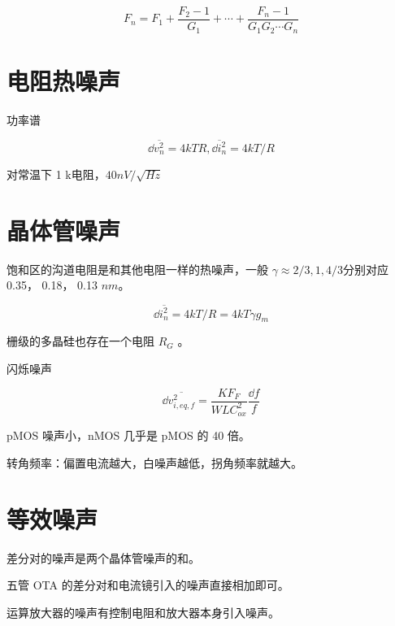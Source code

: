 \documentclass[cn,11pt,chinese,black,simple]{../elegantbook}
\begin{document}
\[F_n = F_1 + \frac{F_2 - 1}{G_1} + \cdots + \frac{F_n - 1}{G_1 G_2 \cdots G_n}\]

\section{电阻热噪声}

功率谱

\[{\dd{}\overline{v_n^2} = 4 k T R}, \overline{\dd{i_n^2}} = 4kT/R\]

对常温下 1 k电阻，\(40 nV/\sqrt{Hz}\)
\section{晶体管噪声}

饱和区的沟道电阻是和其他电阻一样的热噪声，一般 \(\gamma \approx 2/3, 1, 4/3\)分别对应 0.35， 0.18， 0.13 \(nm\)。

\[\dd{\overline{i_n^2}} = 4 k T / R = 4 k T \gamma g_m\]

栅级的多晶硅也存在一个电阻 \(R_G\) 。

闪烁噪声 

\[\dd{\overline{v_{i,eq,f}^2}} = \frac{KF_F}{WLC_{ox}^2}\frac{\dd{f}}{f}\]

pMOS 噪声小，nMOS 几乎是 pMOS 的 40 倍。

转角频率：偏置电流越大，白噪声越低，拐角频率就越大。

\section{等效噪声}

差分对的噪声是两个晶体管噪声的和。

五管 OTA 的差分对和电流镜引入的噪声直接相加即可。

运算放大器的噪声有控制电阻和放大器本身引入噪声。



\section{}

\let\chapname\undefined
\ifx\mainclass\undefined
\end{document}
